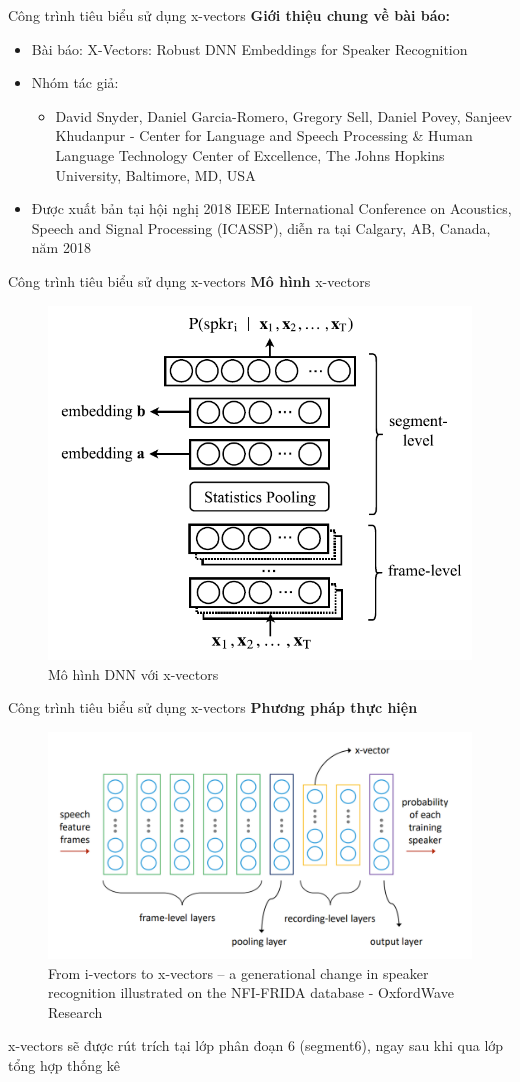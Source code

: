 \documentclass[notheorems, aspectratio=54]{beamer}
\begin{document}
\begin{frame}{Công trình tiêu biểu sử dụng x-vectors}
\textbf{Giới thiệu chung về bài báo:}
\begin{itemize}
	\item Bài báo: X-Vectors: Robust DNN Embeddings for Speaker Recognition
	\item Nhóm tác giả: 
	\begin{itemize}
		\item David Snyder, Daniel Garcia-Romero, Gregory Sell, Daniel Povey, Sanjeev Khudanpur - Center for Language and Speech Processing \& Human Language Technology Center of Excellence, The Johns Hopkins University, Baltimore, MD, USA
	\end{itemize}
	\item Được xuất bản tại hội nghị 2018 IEEE International Conference on Acoustics, Speech and Signal Processing (ICASSP), diễn ra tại Calgary, AB, Canada, năm 2018
\end{itemize}
\end{frame}
\begin{frame}{Công trình tiêu biểu sử dụng x-vectors}
	\textbf{Mô hình} x-vectors
	\begin{figure}[H]
		\includegraphics[width=0.65\linewidth]{images/x-vector.jpg}
		\caption{Mô hình DNN với x-vectors}
		\label{fig:writing-thesis}
	\end{figure}
\end{frame}
\begin{frame}{Công trình tiêu biểu sử dụng x-vectors}
	\textbf{Phương pháp thực hiện}
	\begin{figure}[H]
		\centering
		\includegraphics[width=0.75\linewidth]{images/x_vectors_dnn.png}
		\caption{From i-vectors to x-vectors – a generational change in speaker recognition illustrated on the NFI-FRIDA database - OxfordWave Research}
		\label{fig:writing-thesis}
	\end{figure}
	x-vectors sẽ được rút trích tại lớp phân đoạn 6 (segment6), ngay sau khi qua lớp tổng hợp thống kê
\end{frame}
\end{document}
